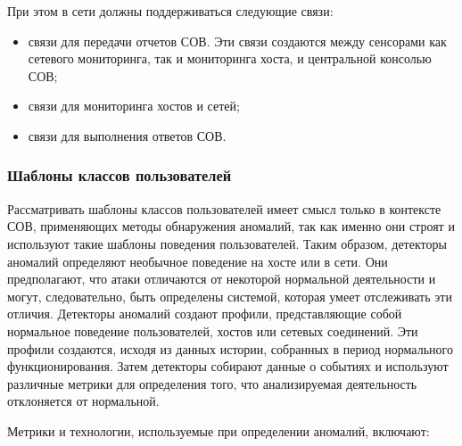 При этом в сети должны поддерживаться следующие связи:

\begin{itemize}
	\item связи для передачи отчетов СОВ. Эти связи создаются между сенсорами как сетевого 
	мониторинга, так и мониторинга хоста, и центральной консолью СОВ;

	\item связи для мониторинга хостов и сетей;
	
	\item связи для выполнения ответов СОВ.
\end{itemize}



\subsubsection{Шаблоны классов пользователей}

Рассматривать шаблоны классов пользователей имеет смысл только в контексте СОВ, 
применяющих методы обнаружения аномалий, так как именно они строят и используют 
такие шаблоны поведения пользователей. Таким образом, детекторы аномалий определяют 
необычное поведение на хосте или в сети. Они предполагают, что атаки отличаются от 
некоторой нормальной деятельности и могут, следовательно, быть определены системой, 
которая умеет отслеживать эти отличия. Детекторы аномалий создают профили, представляющие 
собой нормальное поведение пользователей, хостов или сетевых соединений. Эти профили 
создаются, исходя из данных истории, собранных в период нормального функционирования. 
Затем детекторы собирают данные о событиях и используют различные метрики для определения 
того, что анализируемая деятельность отклоняется от нормальной.

Метрики и технологии, используемые при определении аномалий, включают:

